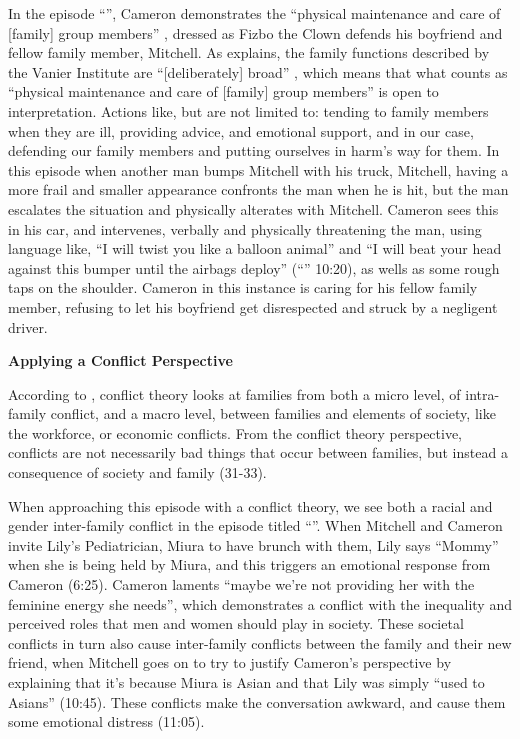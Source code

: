 \documentclass[12pt, letterpaper]{article}
\begin{document}
In the episode ``'', Cameron demonstrates the ``physical maintenance and care of [family] group members'' \autocite[11]{mitchell:2018},
dressed as Fizbo the Clown defends his boyfriend and fellow family member, Mitchell. As \autocite{mirabelli2018s} explains, the family functions described by the Vanier Institute are ``[deliberately] broad'' \autocite[3]{mirabelli2018s}, which means that what counts as ``physical maintenance and care of [family] group members'' is open to interpretation. Actions like, but are not limited to: tending to family members when they are ill, providing advice, and emotional support, and in our case, defending our family members and putting ourselves in harm's way for them. In this episode when another man bumps Mitchell with his truck, Mitchell, having a more frail and smaller appearance confronts the man when he is hit, but the man escalates the situation and physically alterates with Mitchell. Cameron sees this in his car, and intervenes, verbally and physically threatening the man, using language like, ``I will twist you like a balloon animal'' and ``I will beat your head against this bumper until the airbags deploy'' (``'' 10:20), as wells as some rough taps on the shoulder. Cameron in this instance is caring for his fellow family member, refusing to let his boyfriend get disrespected and struck by a negligent driver.

\begin{center}
    \textbf{Applying a Conflict Perspective}
\end{center}

According to \cite{mitchell:2018}, conflict theory looks at families from both a micro level, of intra-family conflict, and a macro level, between families and elements of society, like the workforce, or economic conflicts. From the conflict theory perspective, conflicts are not necessarily bad things that occur between families, but instead a consequence of society and family (31-33).

When approaching this episode with a conflict theory, we see both a racial and gender inter-family conflict in the episode titled ``''. When Mitchell and Cameron invite Lily's Pediatrician, Miura to have brunch with them, Lily says ``Mommy'' when she is being held by Miura, and this triggers an emotional response from Cameron (6:25). Cameron laments ``maybe we're not providing her with the feminine energy she needs'', which demonstrates a conflict with the inequality and perceived roles that men and women should play in society. These societal conflicts in turn also cause inter-family conflicts between the family and their new friend, when Mitchell goes on to try to justify Cameron's perspective by explaining that it's because Miura is Asian and that Lily was simply ``used to Asians'' (10:45). These conflicts make the conversation awkward, and cause them some emotional distress (11:05).
\end{document}
